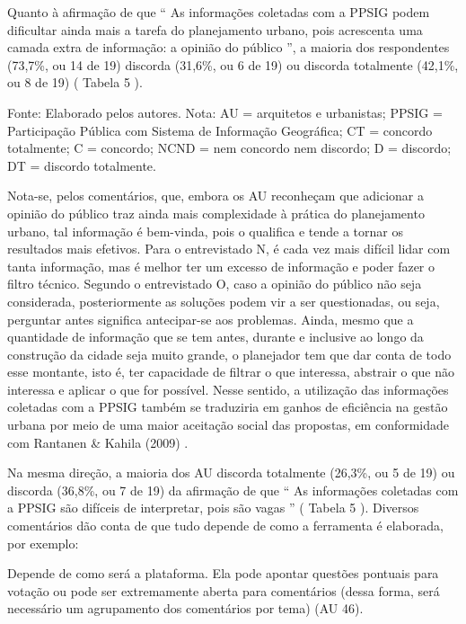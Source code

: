 \documentclass{article}
\begin{document}
Quanto à afirmação de que “%
As informações coletadas com a PPSIG podem
						dificultar ainda mais a tarefa do planejamento urbano, pois acrescenta uma
						camada extra de informação: a opinião do público%
”, a maioria dos
					respondentes (73,7\%, ou 14 de 19) discorda (31,6\%, ou 6 de 19) ou discorda
					totalmente (42,1\%, ou 8 de 19) (%
Tabela
					5%
).

Fonte: Elaborado pelos autores. Nota: AU = arquitetos e urbanistas;
								PPSIG = Participação Pública com Sistema de Informação Geográfica;
								CT = concordo totalmente; C = concordo; NCND = nem concordo nem
								discordo; D = discordo; DT = discordo totalmente.

Nota-se, pelos comentários, que, embora os AU reconheçam que adicionar a opinião
					do público traz ainda mais complexidade à prática do planejamento urbano, tal
					informação é bem-vinda, pois o qualifica e tende a tornar os resultados mais
					efetivos. Para o entrevistado N, é cada vez mais difícil lidar com tanta
					informação, mas é melhor ter um excesso de informação e poder fazer o filtro
					técnico. Segundo o entrevistado O, caso a opinião do público não seja
					considerada, posteriormente as soluções podem vir a ser questionadas, ou seja,
					perguntar antes significa antecipar-se aos problemas. Ainda, mesmo que a
					quantidade de informação que se tem antes, durante e inclusive ao longo da
					construção da cidade seja muito grande, o planejador tem que dar conta de todo
					esse montante, isto é, ter capacidade de filtrar o que interessa, abstrair o que
					não interessa e aplicar o que for possível. Nesse sentido, a utilização das
					informações coletadas com a PPSIG também se traduziria em ganhos de eficiência
					na gestão urbana por meio de uma maior aceitação social das propostas, em
					conformidade com %
Rantanen \& Kahila
						(2009)%
.

Na mesma direção, a maioria dos AU discorda totalmente (26,3\%, ou 5 de 19) ou
					discorda (36,8\%, ou 7 de 19) da afirmação de que “%
As informações
						coletadas com a PPSIG são difíceis de interpretar, pois são vagas%
”
						(%
Tabela 5%
). Diversos comentários dão
					conta de que tudo depende de como a ferramenta é elaborada, por exemplo: 

Depende de como será a plataforma. Ela pode apontar questões pontuais para
						votação ou pode ser extremamente aberta para comentários (dessa forma, será
						necessário um agrupamento dos comentários por tema) %
(AU
							46).%
\end{document}

